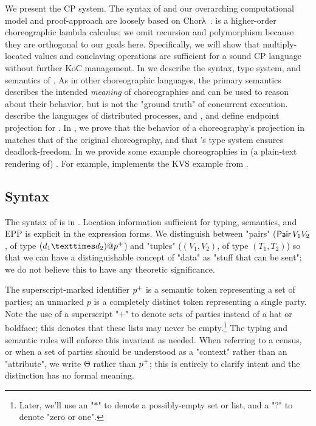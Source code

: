 We present the \HLSCentral CP system.
The syntax of \HLSCentral and our overarching computational model and proof-approach are loosely based on
Chorλ~\cite{chor-lambda}.
\HLSCentral is a higher-order choreographic lambda calculus;
we omit recursion and polymorphism because they are orthogonal to our goals here.
Specifically, we will show that multiply-located values and conclaving operations are sufficient for a sound
CP language without further KoC management.
In 
we describe the syntax, type system, and semantics of \HLSCentral.
As in other choreographic languages, the primary semantics describes the intended \emph{meaning} of choreographies
and can be used to reason about their behavior,
but is not the "ground truth" of concurrent execution.
 describe the languages of distributed processes,
\HLSLocal and \HLSNet,
and define endpoint projection for \HLSCentral.
%
In , we prove that the behavior of a choreography's projection in \HLSNet
matches that of the original \HLSCentral choreography, and that \HLSCentral's type system ensures deadlock-freedom.
In  we provide some example choreographies in (a plain-text rendering of) \HLSCentral.
For example,  implements the KVS example from .

\subsection{Syntax}\label{sec:syntax}
The syntax of \HLSCentral is in .
Location information sufficient for typing, semantics, and EPP is explicit in
the expression forms.
We distinguish between "pairs"
($\operatorname{\mathsf{Pair}} V_1 V_2$, of type $(d_1 × d_2)@\nonempty{p}$)
and "tuples"
($(V_1, V_2)$, of type $(T_1, T_2)$)
so that we can have a distinguishable concept of "data" as "stuff that can be sent";
we do not believe this to have any theoretic significance.

The superscript-marked identifier ${p^{+}}$ is a semantic token representing a set of parties;
an unmarked $p$ is a completely distinct token representing a single party.
Note the use of a superscript "$+$" to denote sets of parties
instead of a hat or boldface;
this denotes that these lists may never be empty.\footnote{
Later, we'll use an "$\ast$" to denote a possibly-empty set or list,
and a "$?$" to denote "zero or one".
}
The typing and semantic rules will enforce this invariant as needed.
When referring to a census, or when a set of parties should be understood as a "context"
rather than an "attribute",
we write Θ rather than ${p^{+}}$;
this is entirely to clarify intent and the distinction has no formal meaning.

